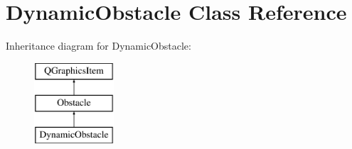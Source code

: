 \hypertarget{class_dynamic_obstacle}{}\section{Dynamic\+Obstacle Class Reference}
\label{class_dynamic_obstacle}
Inheritance diagram for Dynamic\+Obstacle\+:\begin{figure}[H]
\begin{center}
\leavevmode
\includegraphics[height=3.000000cm]{class_dynamic_obstacle}
\end{center}
\end{figure}
